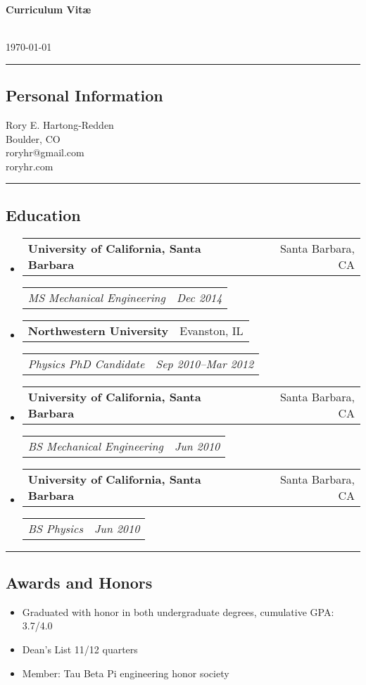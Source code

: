 \documentclass[10pt,letterpaper]{article}
\makeatletter
\newenvironment{indentsection}[1]%
{\begin{list}{}%
	{\setlength{\leftmargin}{#1}}%
	\item[]%
}
{\end{list}}
\newcommand{\headerrow}[2]
	{\begin{tabular*}{\linewidth}{l@{\extracolsep{\fill}}r}
	#1 & #2 
	 \end{tabular*}}
\newcommand{\jobitem}[4]{
	\item \headerrow{\textbf{#1}}{#2}
	\headerrow{\emph{#3}}{\emph{#4}}
}
\makeatother
\begin{document}
{\raggedright \LARGE \bf Curriculum Vit\ae}\\
\today
\newline
\hrule
\subsection*{Personal Information}
\begin{indentsection}{\parindent}
Rory E. Hartong-Redden \\
Boulder, CO   \\
roryhr@gmail.com \\
roryhr.com
\end{indentsection}

\hrule
\subsection*{Education}
\begin{itemize}
	\jobitem{University of California, Santa Barbara}	{Santa Barbara, CA}
			{MS  Mechanical Engineering}			{Dec 2014}
	\jobitem{Northwestern University}					{Evanston, IL}
		    {Physics PhD Candidate}					{Sep 2010--Mar 2012}
	\jobitem{University of California, Santa Barbara}	{Santa Barbara, CA}	
			{BS Mechanical Engineering} 				{Jun 2010}
	\jobitem{University of California, Santa Barbara}	{Santa Barbara, CA}	
			{BS Physics} 								{Jun 2010}
\end{itemize}

\hrule
\subsection*{Awards and Honors}
\begin{indentsection}{\parindent}
	\begin{itemize}
		\parskip=-0.1em
		\item Graduated with honor in both undergraduate degrees, cumulative GPA: 3.7/4.0
		\item Dean's List 11/12 quarters
		\item Member: Tau Beta Pi engineering honor society
	\end{itemize}
\end{indentsection}
\end{document}
